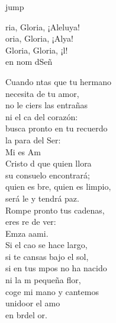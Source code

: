 \begin{cancion}jump\\
	\begin{chorus}%
		ria, Gloria, ¡Aleluya!\\
		oria, Gloria, ¡Alya!\\
		Gloria, Gloria, ¡l!\\
		en nom dSeñ\jump\\
	\end{chorus}%
	Cuando ntas que tu hermano\\
	\jump
necesita de tu amor,\\
	no le ciers las entrañas\\
	ni el ca del corazón:\\
	\jump
busca pronto en tu recuerdo\\
	la para del Ser:\\
	Mi  es  Am \\
	\jump
	Cristo d que quien llora\\
	\jump
su consuelo encontrará;\\
	quien es bre, quien es limpio,\\
	será le y tendrá paz.\\
	\jump
Rompe pronto tus cadenas,\\
	eres re de ver:\\
	Emza aami.\\
	\jump
	Si el cao se hace largo,\\
	\jump
si te cansas bajo el sol,\\
	si en tus mpos no ha nacido\\
	ni la m pequeña flor,\\
	\jump
coge mi mano y cantemos\\
	unidoor el amo \\
	en brdel or.\\
\end{cancion}%
